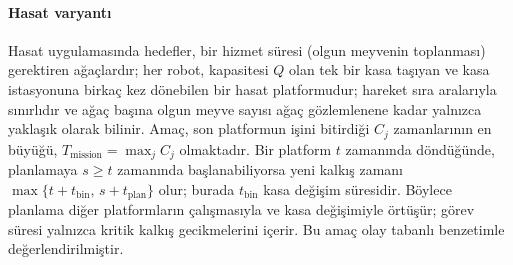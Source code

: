 \paragraph{Hasat varyantı} Hasat uygulamasında
hedefler, bir hizmet süresi (olgun meyvenin toplanması) gerektiren ağaçlardır; her robot,
kapasitesi $Q$ olan tek bir kasa taşıyan ve kasa istasyonuna birkaç kez dönebilen
bir hasat platformudur; hareket sıra aralarıyla sınırlıdır ve ağaç başına olgun
meyve sayısı ağaç gözlemlenene kadar yalnızca yaklaşık olarak bilinir.
Amaç, son platformun işini bitirdiği $C_j$ zamanlarının en büyüğü,
$T_{\text{mission}}=\max_j C_j$ olmaktadır. Bir platform $t$ zamanında döndüğünde,
planlamaya $s\ge t$ zamanında başlanabiliyorsa yeni kalkış zamanı
$\max\{t+t_{\text{bin}},\,s+t_{\text{plan}}\}$ olur; burada $t_{\text{bin}}$
kasa değişim süresidir. Böylece planlama diğer platformların çalışmasıyla ve
kasa değişimiyle örtüşür; görev süresi yalnızca kritik kalkış gecikmelerini içerir.
Bu amaç olay tabanlı benzetimle değerlendirilmiştir.
